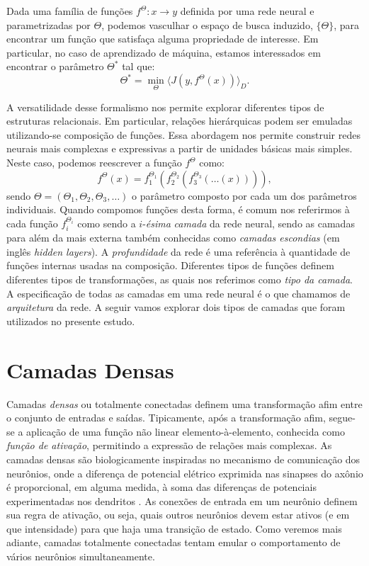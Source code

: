 Dada uma família de funções $f^{\Theta} : x \rightarrow y$ definida por uma rede neural e parametrizadas por $\Theta$, podemos vasculhar o espaço de busca induzido, $\{\Theta\}$, para encontrar um função que satisfaça alguma propriedade de interesse. Em particular, no caso de aprendizado de máquina, estamos interessados em encontrar o parâmetro $\Theta^*$ tal que:
\begin{equation}\label{thetaotimo}
\Theta^* = \min_{\Theta} \langle J(y, f^{\Theta}(x)) \rangle_{D}.
\end{equation} 

A versatilidade desse formalismo nos permite explorar diferentes tipos de estruturas relacionais. Em particular, relações hierárquicas podem ser emuladas utilizando-se composição de funções. Essa abordagem nos permite construir redes neurais mais complexas e expressivas a partir de unidades básicas mais simples. Neste caso, podemos reescrever a função $f^{\Theta}$ como:
\begin{equation}\label{fcamadas}
f^{\Theta}(x) = f_1^{\Theta_1}(f_2^{\Theta_2} (f_3^{\Theta_3}(\ldots(x))) ),
\end{equation}
sendo $\Theta = (\Theta_1, \Theta_2, \Theta_3, \ldots)$ o parâmetro composto por cada um dos parâmetros individuais.
Quando compomos funções desta forma, é comum nos referirmos à cada função $f_i^{\Theta_i}$ como sendo a $i$-\textit{ésima} \textit{camada} da rede neural, sendo as camadas para além da mais externa também conhecidas como \textit{camadas escondias} (em inglês \textit{hidden layers}). A \textit{profundidade} da rede é uma referência à quantidade de funções internas usadas na composição. Diferentes tipos de funções definem diferentes tipos de transformações, as quais nos referimos como \textit{tipo da camada}. A especificação de todas as camadas em uma rede neural é o que chamamos de \textit{arquitetura} da rede. A seguir vamos explorar dois tipos de camadas que foram utilizados no presente estudo.

\section{Camadas Densas}

Camadas \textit{densas} ou totalmente conectadas definem uma transformação afim entre o conjunto de entradas e saídas. Tipicamente, após a transformação afim, segue-se a aplicação de uma função não linear elemento-à-elemento, conhecida como \textit{função de ativação}, permitindo a expressão de relações mais complexas. As camadas densas são biologicamente inspiradas no mecanismo de comunicação dos neurônios, onde a diferença de potencial elétrico exprimida nas sinapses do axônio é proporcional, em alguma medida, à soma das diferenças de potenciais experimentadas nos dendritos \cite{GerstnerNeuronalDynamics}. As conexões de entrada em um neurônio definem sua regra de ativação, ou seja, quais outros neurônios devem estar ativos (e em que intensidade) para que haja uma transição de estado. Como veremos mais adiante, camadas totalmente conectadas tentam emular o comportamento de vários neurônios simultaneamente.

